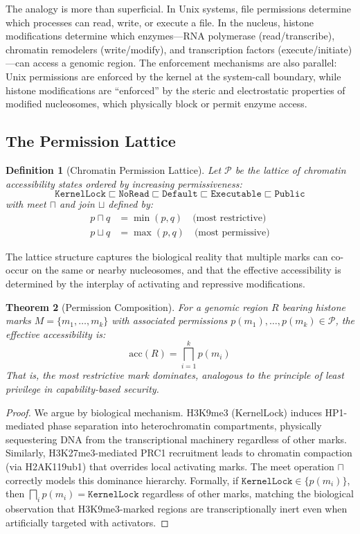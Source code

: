 \documentclass[12pt,a4paper]{article}
\newtheorem{theorem}{Theorem}[section]
\newtheorem{definition}[theorem]{Definition}
\begin{document}
The analogy is more than superficial. In Unix systems, file permissions determine which processes can read, write, or execute a file. In the nucleus, histone modifications determine which enzymes---RNA polymerase (read/transcribe), chromatin remodelers (write/modify), and transcription factors (execute/initiate)---can access a genomic region. The enforcement mechanisms are also parallel: Unix permissions are enforced by the kernel at the system-call boundary, while histone modifications are ``enforced'' by the steric and electrostatic properties of modified nucleosomes, which physically block or permit enzyme access.

\subsection{The Permission Lattice}

\begin{definition}[Chromatin Permission Lattice]
\label{def:perm-lattice}
Let $\mathcal{P}$ be the lattice of chromatin accessibility states ordered by increasing permissiveness:
\[
    \texttt{KernelLock} \sqsubset \texttt{NoRead} \sqsubset \texttt{Default} \sqsubset \texttt{Executable} \sqsubset \texttt{Public}
\]
with meet $\sqcap$ and join $\sqcup$ defined by:
\begin{align}
    p \sqcap q &= \min(p, q) \quad \text{(most restrictive)} \\
    p \sqcup q &= \max(p, q) \quad \text{(most permissive)}
\end{align}
\end{definition}

The lattice structure captures the biological reality that multiple marks can co-occur on the same or nearby nucleosomes, and that the effective accessibility is determined by the interplay of activating and repressive modifications.

\begin{theorem}[Permission Composition]
\label{thm:perm-compose}
For a genomic region $R$ bearing histone marks $M = \{m_1, \ldots, m_k\}$ with associated permissions $p(m_1), \ldots, p(m_k) \in \mathcal{P}$, the effective accessibility is:
\[
    \mathrm{acc}(R) = \bigsqcap_{i=1}^{k} p(m_i)
\]
That is, the most restrictive mark dominates, analogous to the principle of least privilege in capability-based security.
\end{theorem}

\begin{proof}
We argue by biological mechanism. H3K9me3 (KernelLock) induces HP1-mediated phase separation into heterochromatin compartments, physically sequestering DNA from the transcriptional machinery regardless of other marks. Similarly, H3K27me3-mediated PRC1 recruitment leads to chromatin compaction (via H2AK119ub1) that overrides local activating marks. The meet operation $\sqcap$ correctly models this dominance hierarchy. Formally, if $\texttt{KernelLock} \in \{p(m_i)\}$, then $\bigsqcap_i p(m_i) = \texttt{KernelLock}$ regardless of other marks, matching the biological observation that H3K9me3-marked regions are transcriptionally inert even when artificially targeted with activators.
\end{proof}
\end{document}
